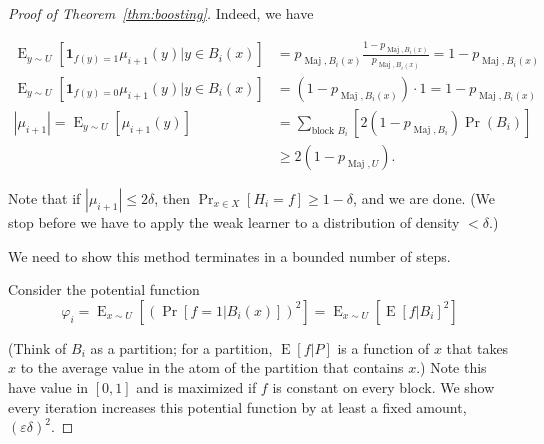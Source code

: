 \begin{proof}[Proof of Theorem~\ref{thm:boosting}]
Indeed, we have

\begin{align}
\operatorname{E}_{y\sim U}[\mathbf{1}_{f(y)=1} 
 \mu_{i+1}(y) |y\in B_i(x)]
 &=p_{\operatorname{Maj}, B_i(x)} \frac{1-p_{\operatorname{Maj}, B_i(x)}}{p_{\operatorname{Maj}, B_i(x)}} = 1-p_{\operatorname{Maj}, B_i(x)}\\
 \operatorname{E}_{y\sim U}[\mathbf{1}_{f(y)=0} 
 \mu_{i+1}(y) |y\in B_i(x)]
 &=\left(1-p_{\operatorname{Maj}, B_i(x)}\right)\cdot 1 = 1-p_{\operatorname{Maj}, B_i(x)}\\
|\mu_{i+1}| =  \operatorname{E}_{y\sim U}[
 \mu_{i+1}(y)]&=\sum_{\text{block }B_i} [2(1-p_{\operatorname{Maj}, B_i}) \Pr(B_i)]\\
 & \ge 2(1-p_{\operatorname{Maj},U}).
\end{align}

Note that if $|\mu_{i+1}|\le 2\delta$, then $\Pr_{x\in X}[H_i=f]\ge 1-\delta$, and we are done. (We stop before we have to apply the weak learner to a distribution of density $<\delta$.)

We need to show this method terminates in a bounded number of steps.

Consider the potential function
$$
\varphi_i = \operatorname{E}_{x\sim U} [(\Pr[f=1|B_i(x)])^2]
 = \operatorname{E}_{x\sim U} [\operatorname{E}[ f|B_i]^2]
$$

(Think of $B_i$ as a partition; for a partition, $\operatorname{E}[f|P]$ is a function of $x$ that takes $x$ to the average value in the atom of the partition that contains $x$.)
Note this have value in $[0,1]$ and is maximized if $f$ is constant on every block. We show every iteration increases this potential 
function by at least a fixed amount, $(\varepsilon\delta)^2$.


\end{proof}
